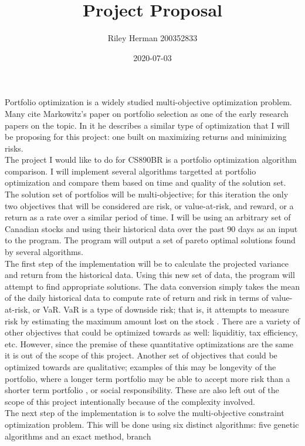 \documentclass{article}
\title{Project Proposal}
\date{2020-07-03}
\author{Riley Herman 200352833}
\begin{document}
\maketitle
\newpage
{}
Portfolio optimization is a widely studied multi-objective optimization problem. Many cite Markowitz's
paper on portfolio selection as one of the early research papers on the topic. In it he describes
a similar type of optimization that I will be proposing for this project: one built on maximizing
returns and minimizing risks. \cite{Markowitz} \\
The project I would like to do for CS890BR is a portfolio optimization algorithm comparison.
I will implement several algorithms targetted at portfolio optimization and compare them based
on time and quality of the solution set. The solution set of portfolios will be multi-objective;
for this iteration the only two objectives that will be considered are risk, or value-at-risk,
and reward, or a return as a rate over a similar period of time.
I will be using an arbitrary set of Canadian stocks and using their historical data over the past 90 days
as an input to the program. The program will output a set of pareto optimal solutions found by several
algorithms. \\
The first step of the implementation will be to calculate the projected variance and return
from the historical data. Using this new set of data, the program will attempt to find appropriate
solutions. The data conversion simply takes the mean of the daily historical data to compute rate
of return and risk in terms of value-at-risk, or VaR. VaR is a type of downside risk; that is,
it attempts to measure risk by estimating the maximum amount lost on the stock \cite{HongHuZhang} \cite{Cid}.
There are a variety of other objectives that could be optimized towards as well: liquiditiy, tax
efficiency, etc. However, since the premise of these quantitative optimizations are the same it is 
out of the scope of this project. Another set of objectives that could be optimized towards are qualitative; 
examples of this may be longevity of the portfolio, where a longer term portfolio may be able to accept
more risk than a shorter term portfolio \cite{Xiongetal}, or social responsibility. These are also left 
out of the scope of this project intentionally because of the complexity involved. \\
The next step of the implementation is to solve the multi-objective constraint optimization problem.
This will be done using six distinct algorithms: five genetic algorithms and an exact method, branch
\end{document}
